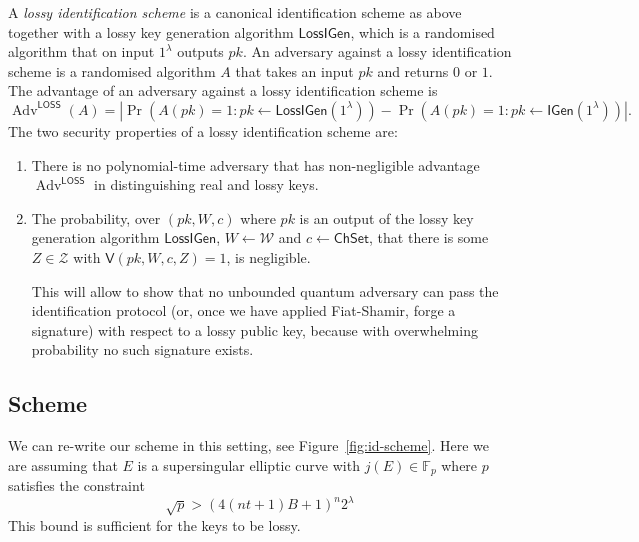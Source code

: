 \documentclass{llncs}
\newcommand{\F}{\mathbb{F}}
\DeclareMathOperator{\Adv}{Adv}
\newcommand{\IGen}{\mathsf{IGen}}
\newcommand{\VV}{\mathsf{V}}
\newcommand{\Wset}{\mathcal{W}}
\newcommand{\Zset}{\mathcal{Z}}
\newcommand{\ChSet}{\textsf{ChSet}}
\newcommand{\LossIGen}{\mathsf{LossIGen}}
\begin{document}
A \emph{lossy identification scheme} is a canonical identification scheme as above together with a lossy key generation algorithm $\LossIGen$, which is a randomised algorithm that on input $1^\lambda$ outputs $pk$.
An adversary against a lossy identification scheme is a randomised algorithm $A$ that takes an input $pk$ and returns $0$ or $1$.
The advantage of an adversary against a lossy identification scheme is 
\[
   \Adv^{\textsf{LOSS}}(A) = \left|
   \Pr\left( A( pk ) = 1 : pk \leftarrow \LossIGen(1^\lambda) \right) - \Pr\left( A( pk ) = 1 : pk \leftarrow \IGen( 1^\lambda ) \right) \right|.
\]
The two security properties of a lossy identification scheme are:
\begin{enumerate}
\item There is no polynomial-time adversary that has non-negligible advantage $\Adv^{\textsf{LOSS}}$ in distinguishing real and lossy keys.
\item The probability, over $(pk, W, c)$ where $pk$ is an output of the lossy key generation algorithm $\LossIGen$, $W \leftarrow \Wset$ and $c \leftarrow \ChSet$, that there is some $Z \in \Zset$ with $\VV( pk, W, c, Z ) = 1$, is negligible.

This will allow to show that no unbounded quantum adversary can pass the identification protocol (or, once we have applied Fiat-Shamir, forge a signature) with respect to a lossy public key, because with overwhelming probability no such signature exists.
\end{enumerate}


\subsection{Scheme}

We can re-write our scheme in this setting, see Figure~\ref{fig:id-scheme}.
Here we are assuming that $E$ is a supersingular elliptic curve with $j(E) \in \F_p$ where $p$ satisfies the constraint
\begin{equation} \label{eq:lossy-p-bound}
  \sqrt{p} > (4(nt+1)B + 1)^{n} 2^\lambda
\end{equation}
This bound is sufficient for the keys to be lossy.
\end{document}

